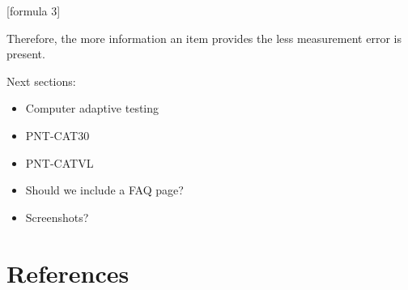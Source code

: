 \documentclass[
  english,
  jou]{apa6}
\providecommand{\tightlist}{%
  \setlength{\itemsep}{0pt}\setlength{\parskip}{0pt}}
\begin{document}
{[}formula 3{]}

Therefore, the more information an item provides the less measurement error is present.

Next sections:

\begin{itemize}
\tightlist
\item
  Computer adaptive testing
\item
  PNT-CAT30
\item
  PNT-CATVL
\item
  Should we include a FAQ page?
\item
  Screenshots?
\end{itemize}

\hypertarget{references}{%
\section{References}\label{references}}
\end{document}
